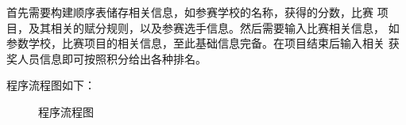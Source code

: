 \documentclass[UTF8,titlepage]{ctexart}
\numberwithin{figure}{section}
\begin{document}
首先需要构建顺序表储存相关信息，如参赛学校的名称，获得的分数，比赛
项目，及其相关的赋分规则，以及参赛选手信息。然后需要输入比赛相关信息，
如参数学校，比赛项目的相关信息，至此基础信息完备。在项目结束后输入相关
获奖人员信息即可按照积分给出各种排名。

程序流程图如下：
\begin{figure}[H]
\centering
 \caption{程序流程图}
 \label{}
\end{figure}
\end{document}
